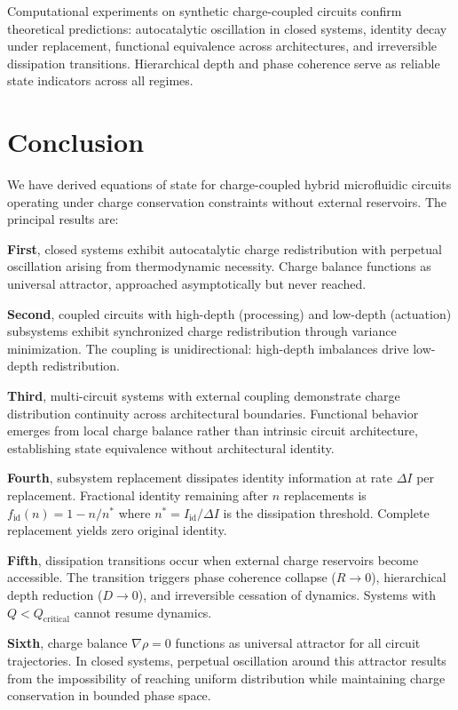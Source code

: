 \documentclass[12pt,a4paper]{article}
\theoremstyle{plain}
\theoremstyle{definition}
\theoremstyle{remark}
\begin{document}
Computational experiments on synthetic charge-coupled circuits confirm theoretical predictions: autocatalytic oscillation in closed systems, identity decay under replacement, functional equivalence across architectures, and irreversible dissipation transitions. Hierarchical depth and phase coherence serve as reliable state indicators across all regimes.

\section{Conclusion}
\label{sec:conclusion}

We have derived equations of state for charge-coupled hybrid microfluidic circuits operating under charge conservation constraints without external reservoirs. The principal results are:

\textbf{First}, closed systems exhibit autocatalytic charge redistribution with perpetual oscillation arising from thermodynamic necessity. Charge balance functions as universal attractor, approached asymptotically but never reached.

\textbf{Second}, coupled circuits with high-depth (processing) and low-depth (actuation) subsystems exhibit synchronized charge redistribution through variance minimization. The coupling is unidirectional: high-depth imbalances drive low-depth redistribution.

\textbf{Third}, multi-circuit systems with external coupling demonstrate charge distribution continuity across architectural boundaries. Functional behavior emerges from local charge balance rather than intrinsic circuit architecture, establishing state equivalence without architectural identity.

\textbf{Fourth}, subsystem replacement dissipates identity information at rate $\Delta I$ per replacement. Fractional identity remaining after $n$ replacements is $f_{\text{id}}(n) = 1 - n/n^*$ where $n^* = I_{\text{id}} / \Delta I$ is the dissipation threshold. Complete replacement yields zero original identity.

\textbf{Fifth}, dissipation transitions occur when external charge reservoirs become accessible. The transition triggers phase coherence collapse ($R \to 0$), hierarchical depth reduction ($D \to 0$), and irreversible cessation of dynamics. Systems with $Q < Q_{\text{critical}}$ cannot resume dynamics.

\textbf{Sixth}, charge balance $\nabla \rho = 0$ functions as universal attractor for all circuit trajectories. In closed systems, perpetual oscillation around this attractor results from the impossibility of reaching uniform distribution while maintaining charge conservation in bounded phase space.
\end{document}
